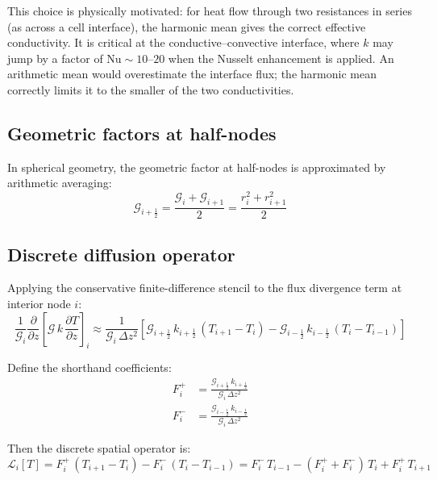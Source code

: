 \documentclass[11pt,a4paper]{article}
\newcommand{\pp}{\partial}
\newcommand{\Nu}{\mathrm{Nu}}
\newcommand{\half}{\tfrac{1}{2}}
\begin{document}
This choice is physically motivated: for heat flow through two
resistances in series (as across a cell interface), the harmonic mean
gives the correct effective conductivity. It is critical at the
conductive--convective interface, where $k$ may jump by a factor of
$\Nu \sim 10$--$20$ when the Nusselt enhancement is applied. An
arithmetic mean would overestimate the interface flux; the harmonic
mean correctly limits it to the smaller of the two conductivities.

\subsection{Geometric factors at half-nodes}

In spherical geometry, the geometric factor at half-nodes is
approximated by arithmetic averaging:
\begin{equation}
\mathcal{G}_{i+\half} = \frac{\mathcal{G}_i + \mathcal{G}_{i+1}}{2}
  = \frac{r_i^2 + r_{i+1}^2}{2}
\end{equation}

\subsection{Discrete diffusion operator}

Applying the conservative finite-difference stencil to the flux
divergence term at interior node $i$:
\begin{equation}
\frac{1}{\mathcal{G}_i}\frac{\pp}{\pp z}\!\left[\mathcal{G}\,k\,\frac{\pp T}{\pp z}\right]_i
\approx
\frac{1}{\mathcal{G}_i\,\Delta z^2}\left[
  \mathcal{G}_{i+\half}\,k_{i+\half}\,(T_{i+1} - T_i)
  - \mathcal{G}_{i-\half}\,k_{i-\half}\,(T_i - T_{i-1})
\right]
\label{eq:Ldiscrete}
\end{equation}

Define the shorthand coefficients:
\begin{align}
F_i^{+} &= \frac{\mathcal{G}_{i+\half}\,k_{i+\half}}
  {\mathcal{G}_i\,\Delta z^2}
\label{eq:Fplus} \\
F_i^{-} &= \frac{\mathcal{G}_{i-\half}\,k_{i-\half}}
  {\mathcal{G}_i\,\Delta z^2}
\label{eq:Fminus}
\end{align}

Then the discrete spatial operator is:
\begin{equation}
\mathcal{L}_i[T] = F_i^{+}\,(T_{i+1} - T_i) - F_i^{-}\,(T_i - T_{i-1})
  = F_i^{-}\,T_{i-1} - (F_i^{+} + F_i^{-})\,T_i + F_i^{+}\,T_{i+1}
\label{eq:Loperator}
\end{equation}
\end{document}
